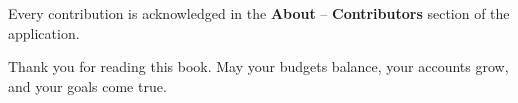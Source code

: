 \noindent Every contribution is acknowledged in the \textbf{About} -- \textbf{Contributors}
section of the application.

\vspace{1cm}

\noindent Thank you for reading this book. May your budgets balance, your accounts grow, and
your goals come true.

